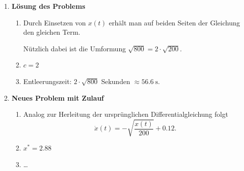 \begin{enumerate}
    \item \textbf{Lösung des Problems}

          \begin{enumerate}
              \item Durch Einsetzen von \(x(t)\) erhält man auf beiden
                    Seiten der Gleichung den gleichen Term.

                    Nützlich dabei ist die Umformung
                    \(\sqrt{800}=2\cdot\sqrt{200}\).

              \item \(c=2\)

              \item Entleerungszeit:
                    \(2\cdot\sqrt{800}\) Sekunden
                    \(\approx \SI{56.6}{\second}\).
          \end{enumerate}

    \item \textbf{Neues Problem mit Zulauf}

          \begin{enumerate}
              \item Analog zur Herleitung der ursprünglichen
                    Differentialgleichung folgt
                    \[
                        \dot{x}(t)
                        =-\sqrt{\frac{x(t)}{200}}+0.12.
                    \]

              \item \(x^*=2.88\)


              \item \dots

          \end{enumerate}
\end{enumerate}











